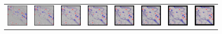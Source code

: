 \documentclass{itatnew}
\begin{document}
\begin{figure}[htp]
\begin{tabular}{cccccccc}
    \includegraphics[width=4.6em]{images/gen-demo-blur-focalgstar-1}&
    \includegraphics[width=4.6em]{images/gen-demo-blur-focalgstar-2}&
    \includegraphics[width=4.6em]{images/gen-demo-blur-focalgstar-3}&
    \includegraphics[width=4.6em]{images/gen-demo-blur-focalgstar-4}&
    \includegraphics[width=4.6em]{images/gen-demo-blur-focalgstar-5}&
    \includegraphics[width=4.6em]{images/gen-demo-blur-focalgstar-6}&
    \includegraphics[width=4.6em]{images/gen-demo-blur-focalgstar-7}&
    \includegraphics[width=4.6em]{images/gen-demo-blur-focalgstar-8}\\
  \end{tabular}
  

\end{figure}
\end{document}
